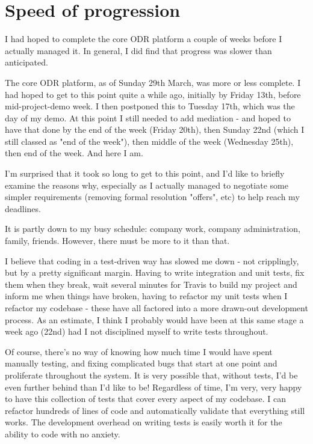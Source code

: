 \section{Speed of progression}

I had hoped to complete the core ODR platform a couple of weeks before I actually managed it. In general, I did find that progress was slower than anticipated.

The core ODR platform, as of Sunday 29th March, was more or less complete. I had hoped to get to this point quite a while ago, initially by Friday 13th, before mid-project-demo week. I then postponed this to Tuesday 17th, which was the day of my demo. At this point I still needed to add mediation - and hoped to have that done by the end of the week (Friday 20th), then Sunday 22nd (which I still classed as "end of the week"), then middle of the week (Wednesday 25th), then end of the week. And here I am.

I'm surprised that it took so long to get to this point, and I'd like to briefly examine the reasons why, especially as I actually managed to negotiate some simpler requirements (removing formal resolution "offers", etc) to help reach my deadlines.

It is partly down to my busy schedule: company work, company administration, family, friends. However, there must be more to it than that.

I believe that coding in a test-driven way has slowed me down - not cripplingly, but by a pretty significant margin. Having to write integration and unit tests, fix them when they break, wait several minutes for Travis to build my project and inform me when things have broken, having to refactor my unit tests when I refactor my codebase - these have all factored into a more drawn-out development process. As an estimate, I think I probably would have been at this same stage a week ago (22nd) had I not disciplined myself to write tests throughout.

Of course, there's no way of knowing how much time I would have spent manually testing, and fixing complicated bugs that start at one point and proliferate throughout the system. It is very possible that, without tests, I'd be even further behind than I'd like to be! Regardless of time, I'm very, very happy to have this collection of tests that cover every aspect of my codebase. I can refactor hundreds of lines of code and automatically validate that everything still works. The development overhead on writing tests is easily worth it for the ability to code with no anxiety.

